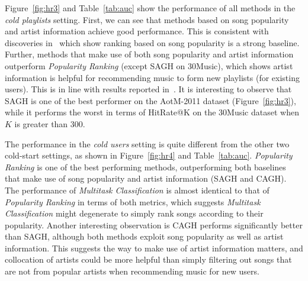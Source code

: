 Figure~\ref{fig:hr3} and Table~\ref{tab:auc} show the performance of all methods in the \emph{cold playlists} setting.
First, we can see that methods based on song popularity and artist information achieve good performance.
This is consistent with discoveries in~\cite{bonnin2013evaluating,jannach2015beyond,bonnin2015automated} which 
show ranking based on song popularity is a strong baseline.
Further, methods that make use of both song popularity and artist information
outperform {\it Popularity Ranking} (except SAGH on 30Music), which shows artist information is helpful for 
recommending music to form new playlists (for existing users).
This is in line with results reported in~\cite{bonnin2013evaluating,bonnin2015automated}.
%
It is interesting to observe that SAGH is one of the best performer on the AotM-2011 dataset (Figure~\ref{fig:hr3}), 
while it performs the worst in terms of HitRate@K on the 30Music dataset when $K$ is greater than 300.
%


The performance in the \emph{cold users} setting %
is quite different from the other two cold-start settings, as shown in Figure~\ref{fig:hr4} and Table~\ref{tab:auc}.
{\it Popularity Ranking} is one of the best performing methods,
outperforming both baselines that make use of song popularity and artist information (\ie SAGH and CAGH).
The performance of {\it Multitask Classification} is almost identical to that of {\it Popularity Ranking} in terms of both metrics,
which suggests {\it Multitask Classification} might degenerate to simply rank songs according to their popularity.
Another interesting observation is CAGH performs significantly better than SAGH,
although both methods exploit song popularity as well as artist information.
This suggests the way to make use of artist information matters,
and collocation of artists could be more helpful than simply filtering out songs that are not from popular artists
when recommending music for new users.

